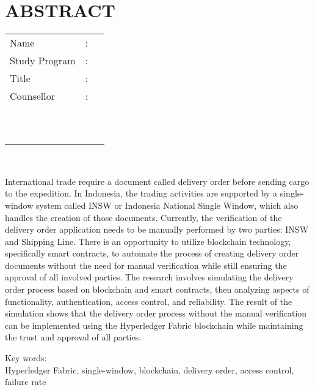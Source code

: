 %
%
%

\chapter*{ABSTRACT}
\singlespacing

\vspace*{0.2cm}

\def\blank{}

\noindent \begin{tabular}{l l p{11.0cm}}
	Name&: & \penulis \\
	Study Program&: & \studyProgram \\
	Title&: & \judulInggris \\
	Counsellor&: & \pembimbingSatu \\
	\ifx\blank\pembimbingDua
	\else
		\ &\ & \pembimbingDua \\
	\fi
	\ifx\blank\pembimbingTiga
	\else
		\ &\ & \pembimbingTiga \\
	\fi
\end{tabular} \\

\vspace*{0.5cm}

\noindent International trade require a document called delivery order before sending cargo to the expedition. In Indonesia, the trading activities are supported by a single-window system called INSW or Indonesia National Single Window, which also handles the creation of those documents. Currently, the verification of the delivery order application needs to be manually performed by two parties: INSW and Shipping Line. There is an opportunity to utilize blockchain technology, specifically smart contracts, to automate the process of creating delivery order documents without the need for manual verification while still ensuring the approval of all involved parties. The research involves simulating the delivery order process based on blockchain and smart contracts, then analyzing aspects of functionality, authentication, access control, and reliability. The result of the simulation shows that the delivery order process without the manual verification can be implemented using the Hyperledger Fabric blockchain while maintaining the trust and approval of all parties. \\

\vspace*{0.2cm}

\noindent Key words: \\ Hyperledger Fabric, single-window, blockchain, delivery order, access control, failure rate \\

\newpage

